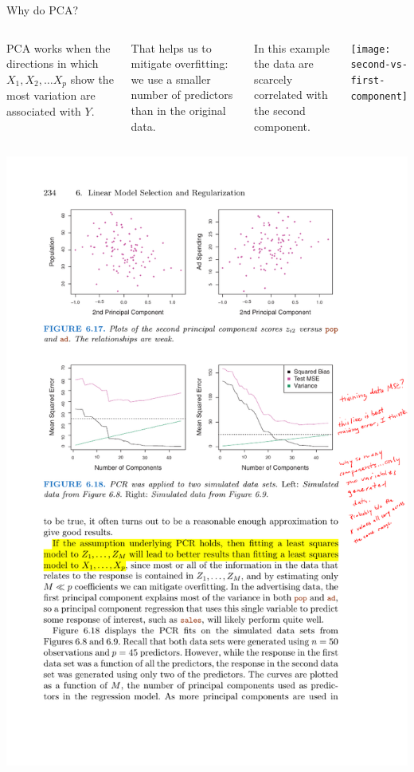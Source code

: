 \documentclass[mathserif]{beamer}
\begin{document}
\begin{frame}{Why do PCA?}

\begin{columns}

PCA works when the directions in which $X_1, X_2,\dots X_p$ show the most variation are associated with $Y$.  \

\vspace*{2mm}

That helps us to mitigate overfitting: we use a smaller number of predictors than in the original data. 

\vspace*{2mm}

In this example the data are scarcely correlated with the second component.

\texttt{[image: second-vs-first-component]}

\end{columns}

\includegraphics[scale=0.9]{ad-or-spend-vs-second-comp}
\end{frame}
\end{document}
